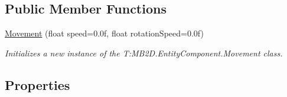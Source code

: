 \subsection*{Public Member Functions}
\begin{DoxyCompactItemize}
\item 
\hyperlink{class_m_b2_d_1_1_entity_component_1_1_movement_a12d8169b44077ab8683db91208d81542}{Movement} (float speed=0.\+0f, float rotation\+Speed=0.\+0f)
\begin{DoxyCompactList}\small\item\em Initializes a new instance of the T\+:\+M\+B2\+D.\+Entity\+Component.\+Movement class. \end{DoxyCompactList}\end{DoxyCompactItemize}
\subsection*{Properties}
